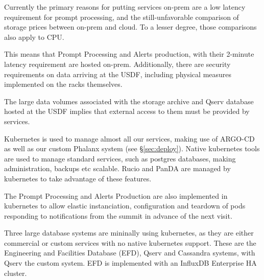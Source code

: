 Currently the primary reasons for putting services on-prem are a low
latency requirement for prompt processing, and the still-unfavorable
comparison of storage prices between on-prem and cloud. To a lesser
degree, those comparisons also apply to CPU.

This means that Prompt Processing and Alerts production, with their
2-minute latency requirement are hosted on-prem. Additionally, there
are security requirements on data arriving at the USDF, including
physical measures implemented on the racks themselves.

The large data volumes associated with the storage archive and Qserv
database hosted at the USDF implies that external access to them must be
provided by services.

Kubernetes is used to manage almost all our services, making use of
ARGO-CD as well as our custom Phalanx system (see \S \ref{sec:deploy}). Native kubernetes tools
are used to manage standard services, such as postgres databases,
making administration, backups etc scalable. Rucio and PanDA are
managed by kubernetes to take advantage of these features.

The Prompt Processing and Alerts Production are also implemented in
kubernetes to allow elastic instanciation, configuration and teardown of
pods responding to notifications from the summit in advance of the
next visit.

Three large database systems are mininally using kubernetes, as they
are either commercial or custom services with no native kubernetes
support. These are the Engineering and Facilities Database (EFD),
Qserv and Cassandra systems, with Qserv the custom system. EFD is
implemented with an InfluxDB Enterprise HA cluster.

